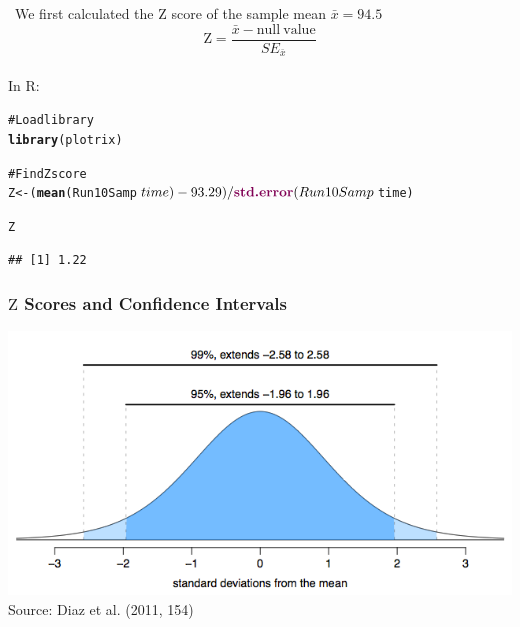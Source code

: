 \documentclass{beamer}\usepackage{graphicx, color}
\makeatletter
\newcommand{\hlfunctioncall}[1]{\textcolor[rgb]{0.501960784313725,0,0.329411764705882}{\textbf{#1}}}%
\newcommand{\hlcomment}[1]{\textcolor[rgb]{0.180392156862745,0.6,0.341176470588235}{#1}}%
\newenvironment{kframe}{%
 \def\at@end@of@kframe{}%
 \ifinner\ifhmode%
  \def\at@end@of@kframe{\end{minipage}}%
  \begin{minipage}{\columnwidth}%
 \fi\fi%
 \def\FrameCommand##1{\hskip\@totalleftmargin \hskip-\fboxsep
 \colorbox{shadecolor}{##1}\hskip-\fboxsep
     \hskip-\linewidth \hskip-\@totalleftmargin \hskip\columnwidth}%
 \MakeFramed {\advance\hsize-\width
   \@totalleftmargin\z@ \linewidth\hsize
   \@setminipage}}%
 {\par\unskip\endMakeFramed%
 \at@end@of@kframe}
\newenvironment{knitrout}{}{} %
\makeatother
\begin{document}
\begin{frame}[fragile]
\
  We first calculated the $\mathrm{Z}$ score of the sample mean $\bar{x} = 94.5$
\[
  \mathrm{Z} = \frac{\bar{x} - \mathrm{null\:value}}{SE_{\bar{x}}}
\]\\[0.25cm]
In R:
\begin{knitrout}
\color{fgcolor}\begin{kframe}
\begin{alltt}
\hlcomment{# Load library}
\hlfunctioncall{library}(plotrix)

\hlcomment{# Find Z score }
Z <- (\hlfunctioncall{mean}(Run10Samp$time) - 93.29)/
      \hlfunctioncall{std.error}(Run10Samp$time)

Z
\end{alltt}
\begin{verbatim}
## [1] 1.22
\end{verbatim}
\end{kframe}
\end{knitrout}

\end{frame}

\begin{frame}
  \frametitle{$\mathrm{Z}$ Scores and Confidence Intervals}
  \begin{center}
    \includegraphics[scale=0.45]{figure/ZScore.png} \\
    Source: Diaz et al. (2011, 154)
  \end{center}
\end{frame}
\end{document}
